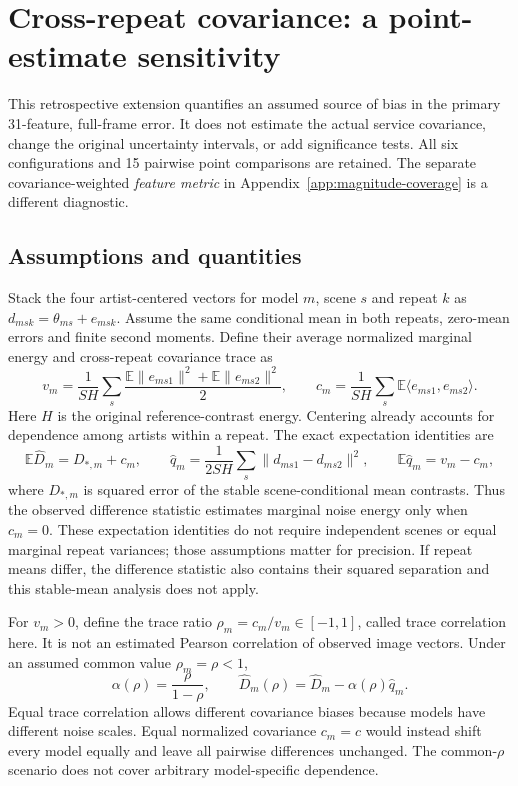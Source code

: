 \section{Cross-repeat covariance: a point-estimate sensitivity}
\label{app:repeat-covariance}

This retrospective extension quantifies an assumed source of bias in the
primary 31-feature, full-frame error. It does not estimate the actual service
covariance, change the original uncertainty intervals, or add significance
tests. All six configurations and 15 pairwise point comparisons are retained.
The separate covariance-weighted \emph{feature metric} in
Appendix~\ref{app:magnitude-coverage} is a different diagnostic.

\subsection{Assumptions and quantities}
Stack the four artist-centered vectors for model $m$, scene $s$ and repeat $k$
as $d_{msk}=\theta_{ms}+e_{msk}$. Assume the same conditional mean in both
repeats, zero-mean errors and finite second moments. Define their average
normalized marginal energy and cross-repeat covariance trace as
\begin{equation}
 v_m=\frac{1}{SH}\sum_s\frac{\mathbb E\|e_{ms1}\|^2+
 \mathbb E\|e_{ms2}\|^2}{2},\qquad
 c_m=\frac{1}{SH}\sum_s\mathbb E\langle e_{ms1},e_{ms2}\rangle.
\end{equation}
Here $H$ is the original reference-contrast energy. Centering already accounts
for dependence among artists within a repeat. The exact expectation identities
are
\begin{equation}
 \mathbb E\widehat D_m=D_{*,m}+c_m,\qquad
 \widehat q_m=\frac{1}{2SH}\sum_s\|d_{ms1}-d_{ms2}\|^2,
 \qquad \mathbb E\widehat q_m=v_m-c_m,
\end{equation}
where $D_{*,m}$ is squared error of the stable scene-conditional mean contrasts.
Thus the observed difference statistic estimates marginal noise energy only
when $c_m=0$. These expectation identities do not require independent scenes
or equal marginal repeat variances; those assumptions matter for precision.
If repeat means differ, the difference statistic also contains their squared
separation and this stable-mean analysis does not apply.

For $v_m>0$, define the trace ratio $\rho_m=c_m/v_m\in[-1,1]$, called trace
correlation here. It is not an estimated Pearson correlation of observed
image vectors. Under an assumed common value $\rho_m=\rho<1$,
\begin{equation}
 \alpha(\rho)=\frac{\rho}{1-\rho},\qquad
 \widehat D_m(\rho)=\widehat D_m-\alpha(\rho)\widehat q_m.
 \label{eq:covariance-scenario}
\end{equation}
Equal trace correlation allows different covariance biases because models
have different noise scales. Equal normalized covariance $c_m=c$ would instead
shift every model equally and leave all pairwise differences unchanged. The
common-$\rho$ scenario does not cover arbitrary model-specific dependence.


